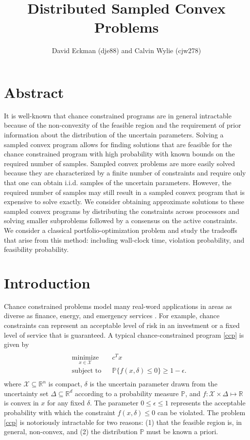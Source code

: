 \documentclass[12pt]{article}
\title{Distributed Sampled Convex Problems}
\author{David Eckman (dje88) and Calvin Wylie (cjw278)}
\date{}
\begin{document}
\setlength{\parindent}{24pt}

\maketitle

\section*{Abstract}
It is well-known that chance constrained programs are in general intractable because of the non-convexity of the feasible region and the requirement of prior information about the distribution of the uncertain parameters.
Solving a sampled convex program allows for finding solutions that are feasible for the chance constrained program with high probability with known bounds on the required number of samples.
Sampled convex problems are more easily solved because they are characterized by a finite number of constraints and require only that one can obtain i.i.d. samples of the uncertain parameters.
However, the required number of samples may still result in a sampled convex program that is expensive to solve exactly.
We consider obtaining approximate solutions to these sampled convex programs by distributing the constraints across processors and solving smaller subproblems followed by a consensus on the active constraints.
We consider a classical portfolio-optimization problem and study the tradeoffs that arise from this method: including wall-clock time, violation probability, and feasibility probability.

\section*{Introduction}
Chance constrained problems model many real-word applications in areas as diverse as finance, energy, and emergency services \cite{bental09}.
For example, chance constraints can represent an acceptable level of risk in an investment or a fixed level of service that is guaranteed.
A typical chance-constrained program \ref{ccp} is given by
\begin{align}\label{ccp}
\begin{split}
\begin{aligned}
    & \underset{x \in \mathcal{X}}{\text{minimize}}
    & & c^T x \\
    & \text{subject to}
    & & \mathbb{P}\{f(x,\delta) \leq 0\} \geq 1-\epsilon.
\end{aligned}
\end{split} \tag{CCP$_\epsilon$}
\end{align}
where $\mathcal{X} \subseteq \mathbb{R}^n$ is compact, $\delta$ is the uncertain parameter drawn from the uncertainty set $\Delta \subseteq \mathbb{R}^d$ according to a probability measure $\mathbb{P}$, and $f:\mathcal{X} \times \Delta \mapsto \mathbb{R}$ is convex in $x$ for any fixed $\delta$.
The parameter $0 \leq \epsilon \leq 1$ represents the acceptable probability with which the constraint $f(x,\delta) \leq 0$ can be violated.
The problem \ref{ccp} is notoriously intractable for two reasons: (1) that the feasible region is, in general, non-convex, and (2) the distribution $\mathbb{P}$ must be known a priori.
\end{document}
